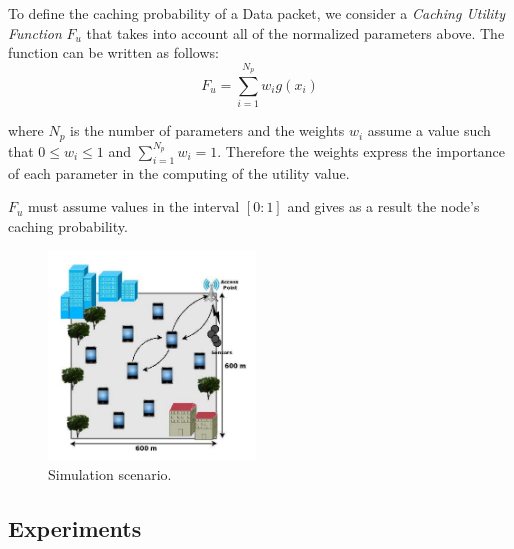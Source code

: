 \documentclass[conference]{IEEEtran}
\begin{document}


To define the caching probability of a Data packet, we consider a \textit{Caching Utility Function} $F_u$ that takes into account
all of the normalized parameters above. The function can be written as follows:
$$F_u = \sum_{i = 1}^{N_p} w_i g(x_i)$$

where $N_p$ is the number of parameters and the weights $w_i$ assume a value such that $0 \leq w_i \leq 1$ and $\sum_{i = 1}^{N_p} w_i = 1$.
Therefore the weights express the importance of each parameter in the computing of the utility value.

$F_u$ must assume values in the interval $[0 : 1]$ and gives as a result the node's caching probability.

\begin{figure}[htbp]
    \centerline{\includegraphics[width=5.5cm]{fig1.png}}
    \caption{Simulation scenario.}
    \label{fig1}
\end{figure}

\subsection{Experiments}
\end{document}
